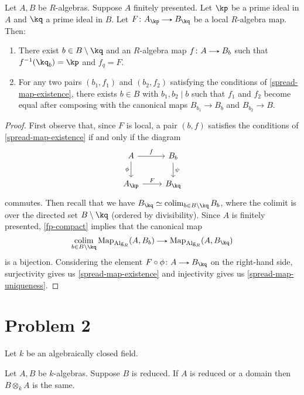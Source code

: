 \begin{proposition}
  \label{spread-map}
  Let $A,B$ be $R$-algebras. Suppose $A$ finitely presented. Let $\kp$ be a prime ideal in $A$ and $\kq$ a prime ideal in $B$. Let $F \c A_\kp \to B_\kq$ be a local $R$-algebra map. Then:
  \begin{enumerate}
  \item \label{spread-map-existence} There exist $b \in B \setminus \kq$ and an $R$-algebra map $f \c A \to B_b$ such that $f^{-1}(\kq_b) = \kp$ and $f_q = F$.
  \item \label{spread-map-uniqueness} For any two pairs $(b_1,f_1)$ and $(b_2,f_2)$ satisfying the conditions of \cref{spread-map-existence}, there exists $b \in B$ with $b_1,b_2 \mid b$ such that $f_1$ and $f_2$ become equal after composing with the canonical maps $B_{b_1} \to B_b$ and $B_{b_2} \to B$.
  \end{enumerate}
\end{proposition}

\begin{proof}
  First observe that, since $F$ is local, a pair $(b,f)$ satisfies the conditions of \cref{spread-map-existence} if and only if the diagram
  \[
    \begin{tikzcd}
      A \ar[r, "f"] \ar[d, "\phi", swap] &
      B_b \ar[d, "\psi"] \\
      A_\kp \ar[r,"F"] &
      B_\kq
    \end{tikzcd}
  \]
  commutes. Then recall that we have $B_\kq \iso \colim_{b \in B \setminus \kq} B_b$, where the colimit is over the directed set $B \setminus \kq$ (ordered by divisibility). Since $A$ is finitely presented, \cref{fp-compact} implies that the canonical map
  \[
    \colim_{b \in B \setminus \kq} \Map_{\Alg_R}(A, B_b) \to \Map_{\Alg_R}(A, B_\kq)
  \]
  is a bijection. Considering the element $F \circ \phi \c A \to B_\kq$ on the right-hand side, surjectivity gives us \cref{spread-map-existence} and injectivity gives us \cref{spread-map-uniqueness}.
\end{proof}


\section{Problem 2}

Let $k$ be an algebraically closed field.

\begin{lemma}
  \label{reduced-tensor}
  Let $A,B$ be $k$-algebras. Suppose $B$ is reduced. If $A$ is reduced or a domain then $B \otimes_k A$ is the same.
\end{lemma}

